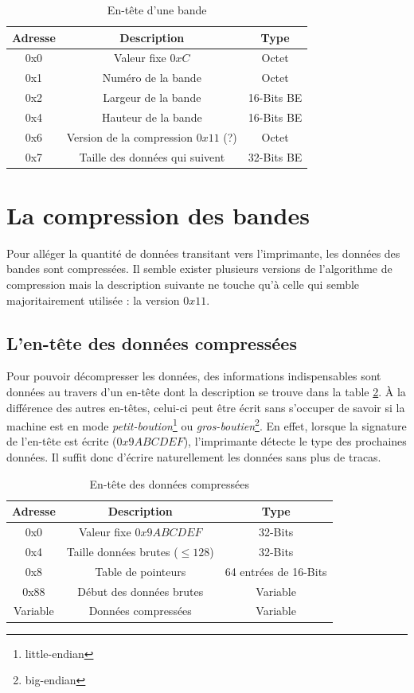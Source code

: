 \begin{table}[!ht]
\centering
\begin{tabular}{| c | c | c |}
\hline
\textbf{Adresse} & \textbf{Description} & \textbf{Type} \\
\hline
\hline
0x0 & Valeur fixe $0xC$ & Octet \\
0x1 & Numéro de la bande & Octet \\
0x2 & Largeur de la bande & 16-Bits BE \\
0x4 & Hauteur de la bande & 16-Bits BE \\
0x6 & Version de la compression $0x11$ (?) & Octet \\
0x7 & Taille des données qui suivent & 32-Bits BE \\
\hline
\end{tabular}
\caption{En-tête d'une bande}
\label{tab:entete_bande}
\end{table}

\section{La compression des bandes}
Pour alléger la quantité de données transitant vers l'imprimante, les
données des bandes sont compressées. Il semble exister plusieurs versions
de l'algorithme de compression mais la description suivante ne touche
qu'à celle qui semble majoritairement utilisée : la version
\textsc{$0x11$}.

\subsection{L'en-tête des données compressées}
Pour pouvoir décompresser les données, des informations indispensables
sont données au travers d'un en-tête dont la description se trouve
dans la table \ref{tab:entete_compression}. À la différence des autres
en-têtes, celui-ci peut être écrit sans s'occuper de savoir si la
machine est en mode \emph{petit-boution}\footnote{little-endian} ou
\emph{gros-boutien}\footnote{big-endian}. En effet, lorsque la
signature de l'en-tête est écrite ($0x9ABCDEF$), l'imprimante détecte
le type des prochaines données. Il suffit donc d'écrire naturellement
les données sans plus de tracas.

\begin{table}[!ht]
\centering
\begin{tabular}{| c | c | c |}
\hline
\textbf{Adresse} & \textbf{Description} & \textbf{Type} \\
\hline
\hline
0x0 & Valeur fixe $0x9ABCDEF$ & 32-Bits \\
0x4 & Taille données brutes ($ \leq 128$) & 32-Bits \\
0x8 & Table de pointeurs & 64 entrées de 16-Bits \\
0x88 & Début des données brutes & Variable \\
Variable & Données compressées & Variable \\
\hline
\end{tabular}
\caption{En-tête des données compressées}
\label{tab:entete_compression}
\end{table}


